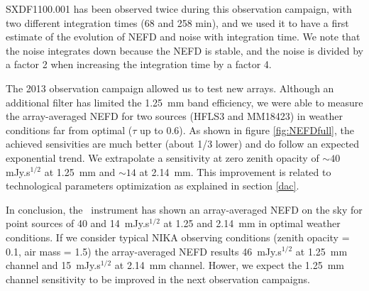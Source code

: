 SXDF1100.001 has been observed twice during this observation campaign, with two different integration times 
(68 and 258 min), and we
used it to have a first estimate of the evolution of NEFD and noise with integration time. 
We note that the noise integrates down because the NEFD is stable, and the noise is divided by a 
factor 2 when increasing the integration time by a factor 4.


The 2013  observation campaign allowed us to test new arrays. Although an additional filter
has limited the 1.25~mm band efficiency, we were able to measure the 
array-averaged NEFD for two sources (HFLS3 and MM18423) in weather conditions far from 
optimal ($\tau$ up to 0.6).  As shown in figure \ref{fig:NEFDfull}, the achieved sensivities are much better (about 1/3 lower) 
and do follow an expected exponential trend. We extrapolate a sensitivity 
at zero zenith opacity of $\sim 40$ mJy.s$^{1/2}$ at 1.25~mm and $\sim 14$ at 2.14~mm. This improvement is related to technological parameters optimization 
as explained in section \ref{dac}.

 
In conclusion, the \NIKA\ instrument has shown an array-averaged NEFD on the sky for point sources of 
40 and 14~mJy.s$^{1/2}$ at 1.25 and 2.14~mm in optimal weather conditions. If we consider typical NIKA observing conditions (zenith opacity = 0.1, air mass = 1.5) the array-averaged NEFD results 46~mJy.s$^{1/2}$ at 1.25~mm channel and 15~mJy.s$^{1/2}$ at 2.14~mm channel. 
Hower, we expect the 1.25~mm channel sensitivity to be improved in the next  observation campaigns.

